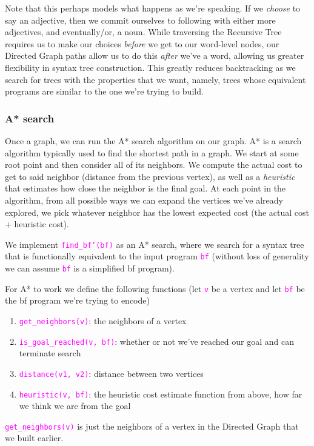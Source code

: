 \documentclass[runningheads]{llncs}
\newcommand{\code}[1]{\texttt{\textcolor{magenta}{\setlength{\fboxsep}{1pt}\colorbox{lightgray!20}{#1}}}}
\begin{document}
Note that this perhaps models what happens as we're speaking. If we \textit{choose} to say an adjective, then we commit ourselves to following with either more adjectives, and eventually/or, a noun. While traversing the Recursive Tree requires us to make our choices \textit{before} we get to our word-level nodes, our Directed Graph paths allow us to do this \textit{after} we've a word, allowing us greater flexibility in syntax tree construction. This greatly reduces backtracking as we search for trees with the properties that we want, namely, trees whose equivalent programs are similar to the one we're trying to build.

\subsubsection*{A* search}
Once a graph, we can run the A* search algorithm on our graph. A* is a search algorithm typically used to find the shortest path in a graph. We start at some root point and then consider all of its neighbors. We compute the actual cost to get to said neighbor (distance from the previous vertex), as well as a \textit{heuristic} that estimates how close the neighbor is the final goal. At each point in the algorithm, from all possible ways we can expand the vertices we've already explored, we pick whatever neighbor has the lowest expected cost (the actual cost + heuristic cost).

We implement \code{find\_bf'(bf)} as an A* search, where we search for a syntax tree that is functionally equivalent to the input program \code{bf} (without loss of generality we can assume \code{bf} is a simplified bf program).

For A* to work we define the following functions (let \code{v}  be a vertex and let \code{bf}  be the bf program we're trying to encode)
\begin{enumerate}
	\item \code{get\_neighbors(v)}: the neighbors of a vertex
	\item \code{is\_goal\_reached(v, bf)}: whether or not we've reached our goal and can terminate search
	\item \code{distance(v1, v2)}: distance between two vertices
	\item \code{heuristic(v, bf)}: the heuristic cost estimate function from above, how far we think we are from the goal
\end{enumerate}


\code{get\_neighbors(v)} is just the neighbors of a vertex in the Directed Graph that we built earlier.
\end{document}

